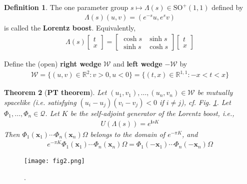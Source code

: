 \documentclass[12pt,b5paper,notitlepage]{article}
\theoremstyle{definition}
\newtheorem{df}{Definition}[section]
\theoremstyle{plain}
\newtheorem{thm}[df]{Theorem}
\newcommand{\mc}{\mathcal}
\newcommand{\scr}{\mathscr}
\newcommand{\im}{\mathbf{i}}
\newcommand{\Rbb}{\mathbb R}
\newcommand{\xbf}{\mathbf x}
\newcommand{\SO}{\mathrm{SO}}
\numberwithin{equation}{section}
\begin{document}
\begin{df}
The one parameter group $s\mapsto \Lambda(s)\in\SO^+(1,1)$ defined by
\begin{align}
\Lambda(s)(u,v)=(e^{-s}u,e^sv) 
\end{align}
is called the \textbf{Lorentz boost}.  Equivalently,
\begin{align}
\Lambda(s)\begin{bmatrix}
t\\
x
\end{bmatrix}
=\begin{bmatrix}
\cosh s&\sinh s\\
\sinh s&\cosh s
\end{bmatrix}
\begin{bmatrix}
t\\
x
\end{bmatrix}
\end{align}
\end{df}

Define the (open) \textbf{right wedge} $\mc W$ and \textbf{left wedge} $-\mc W$ by
\begin{align}
\mc W=\{(u,v)\in\Rbb^2:v>0,u<0\}=\{(t,x)\in\Rbb^{1,1}:-x<t<x\}
\end{align}


\begin{thm}[\textbf{PT theorem}]\label{lb8}
Let $(u_1,v_1),\dots,(u_n,v_n)\in \mc W$ be mutually spacelike (i.e. satisfying $(u_i-u_j)(v_i-v_j)<0$ if $i\neq j$), cf. Fig. \ref{lb6}. Let $\Phi_1,\dots,\Phi_n\in\scr Q$. Let $K$ be the self-adjoint generator of the Lorentz boost, i.e.,
\begin{align*}
U(\Lambda(s))=e^{\im sK}
\end{align*}
Then  $\Phi_1(\xbf_1)\cdots\Phi_n(\xbf_n)\Omega$ belongs to the domain of $e^{-\pi K}$, and
\begin{align}\label{eq16}
e^{-\pi K}\Phi_1(\xbf_1)\cdots\Phi_n(\xbf_n)\Omega=\Phi_1(-\xbf_1)\cdots\Phi_n(-\xbf_n)\Omega
\end{align}
\end{thm}


\begin{figure}[h]
	\centering
	\texttt{[image: fig2.png]}
	\caption{.}\label{lb6}
\end{figure}
\end{document}
